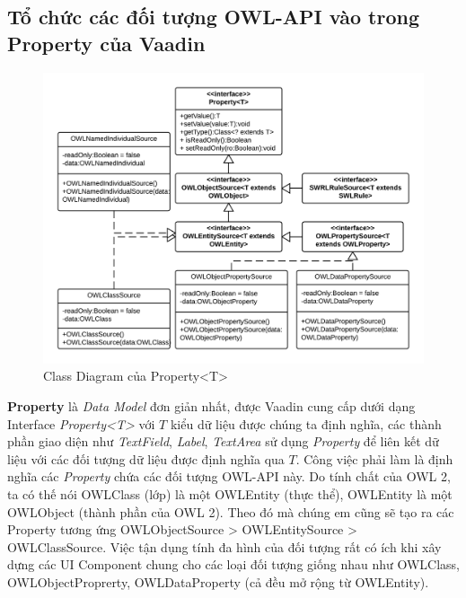 {\subsection{Tổ chức các đối tượng OWL-API vào trong Property của Vaadin}
\begin{figure}[h!]
 	\centering
 	\includegraphics[width=150mm]{Figures/uml_owleditor_owlobjectsource.png}
 	\caption{Class Diagram của Property<T>\label{overflow}}
\end{figure}
\textbf{Property} là \textit{Data Model} đơn giản nhất, được Vaadin cung cấp dưới dạng Interface \textit{Property<T>} với $T$ kiểu dữ liệu được chúng ta định nghĩa, các thành phần giao diện như \textit{TextField}, \textit{Label}, \textit{TextArea} sử dụng \textit{Property} để liên kết dữ liệu với các đối tượng dữ liệu được định nghĩa qua $T$. Công việc phải làm là định nghĩa các \textit{Property} chứa các đối tượng OWL-API này. Do tính chất của OWL 2, ta có thế nói OWLClass (lớp) là một OWLEntity (thực thể), OWLEntity là một OWLObject (thành phần của OWL 2). Theo đó mà chúng em cũng sẽ tạo ra các Property tương ứng OWLObjectSource > OWLEntitySource > OWLClassSource. Việc tận dụng tính đa hình của đối tượng rất có ích khi xây dựng các UI Component chung cho các loại đối tượng giống nhau như OWLClass, OWLObjectProprerty, OWLDataProperty (cả đều mở rộng từ OWLEntity). 
}
